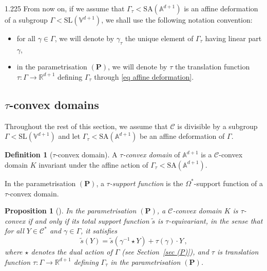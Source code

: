 \documentclass[reqno, a4paper]{amsart}
\numberwithin{equation}{section}
\numberwithin{figure}{section}
\newtheorem{proposition}[theorem]{Proposition}
\theoremstyle{definition}
\newtheorem{definition}[theorem]{Definition}
\theoremstyle{remark}
\newcommand{\R}{\mathbb{R}} %
\newcommand{\V}{\mathbb{V}} %
\newcommand{\A}{\mathbb{A}} %
\newcommand{\SL}{\mathrm{SL}} %
\newcommand{\SA}{\mathrm{SA}} %
\newcommand{\C}{\mathcal{C}} %
\begin{document}
\begin{spacing}{1.225}
From now on, if we assume that $\Gamma_\tau < \SA(\A^{d+1})$ is an affine deformation of a subgroup $\Gamma< \SL(\V^{d+1})$, we shall use the following notation convention:
\begin{itemize}
 \item for all $\gamma \in \Gamma$, we will denote by $\gamma_\tau$ the unique element of $\Gamma_\tau$ having linear part $\gamma$,
 \item in the parametrisation $(\mathbf{P})$, we will denote by $\tau $ the translation function $\tau: \Gamma \to \R^{d+1}$ defining $\Gamma_\tau$ through \eqref{eq affine deformation}.
\end{itemize}
\subsection{\texorpdfstring{$\tau$-convex domains}{tau-convex domains}} 


Throughout the rest of this section, we assume that $\C$ is divisible by a subgroup $\Gamma < \SL(\V^{d+1})$ and let $\Gamma_\tau < \SA(\A^{d+1})$ be an affine deformation of $\Gamma$.

\begin{definition}[$\tau$-convex domain]
\label{def tau-convex domain and tau-support functions}
A \emph{$\tau$-convex domain} of $\A^{d+1}$ is a $\C$-convex domain $K$ invariant under the affine action of $\Gamma_\tau < \SA(\A^{d+1})$.

In the parametrisation $(\mathbf{P})$, a \emph{$\tau$-support function} is the $\Omega^*$-support function of a $\tau$-convex domain. 
\end{definition}



\begin{proposition}[{\cite[Corollary~5.7]{Ablondi_25}}]
\label{prop equiv supp function}
In the parametrisation $(\mathbf{P})$, a $\C$-convex domain $K$ is $\tau$-convex if and only if its total support function $\tilde{s}$ is $\tau$-equivariant, in the sense that for all $Y \in \C^*$ and $\gamma \in \Gamma$, it satisfies 
\begin{equation*}
\label{eq action on C* support function}
\tilde{s}(Y) = \tilde{s}(\gamma^{-1} \star Y) + \tau(\gamma) \cdot Y \, ,
\end{equation*}
where $\star$ denotes the dual action of $\Gamma$ (see Section~\ref{sec (P)}), and $\tau $ is translation function $\tau: \Gamma \to \R^{d+1}$ defining $\Gamma_\tau$ in the parametrisation $(\mathbf{P})$.


\end{proposition}
\end{spacing}
\end{document}
